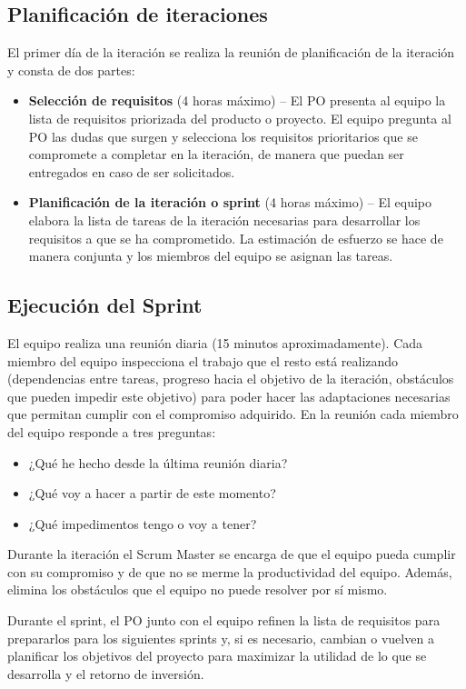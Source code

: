 \subsection{Planificación de iteraciones}
El primer día de la iteración se realiza la reunión de planificación de la iteración y consta de dos partes:
\begin{itemize}
    \item \textbf{Selección de requisitos} (4 horas máximo) – El PO presenta al equipo la lista de requisitos priorizada del producto o proyecto. El equipo pregunta al PO las dudas que surgen y selecciona los requisitos prioritarios que se compromete a completar en la iteración, de manera que puedan ser entregados en caso de ser solicitados.
    \item \textbf{Planificación de la iteración o sprint} (4 horas máximo) – El equipo elabora la lista de tareas de la iteración necesarias para desarrollar los requisitos a que se ha comprometido. La estimación de esfuerzo se hace de manera conjunta y los miembros del equipo se asignan las tareas.
\end{itemize}

\subsection{Ejecución del Sprint}
El equipo realiza una reunión diaria (15 minutos aproximadamente). Cada miembro del equipo inspecciona el trabajo que el resto está realizando (dependencias entre tareas, progreso hacia el objetivo de la iteración, obstáculos que pueden impedir este objetivo) para poder hacer las adaptaciones necesarias que permitan cumplir con el compromiso adquirido. En la reunión cada miembro del equipo responde a tres preguntas:
\begin{itemize}
    \item ¿Qué he hecho desde la última reunión diaria?
    \item ¿Qué voy a hacer a partir de este momento?
    \item ¿Qué impedimentos tengo o voy a tener?
\end{itemize}
Durante la iteración el Scrum Master se encarga de que el equipo pueda cumplir con su compromiso y de que no se merme la productividad del equipo. Además, elimina los obstáculos que el equipo no puede resolver por sí mismo.

Durante el sprint, el PO junto con el equipo refinen la lista de requisitos para prepararlos para los siguientes sprints y, si es necesario, cambian o vuelven a planificar los objetivos del proyecto para maximizar la utilidad de lo que se desarrolla y el retorno de inversión.

